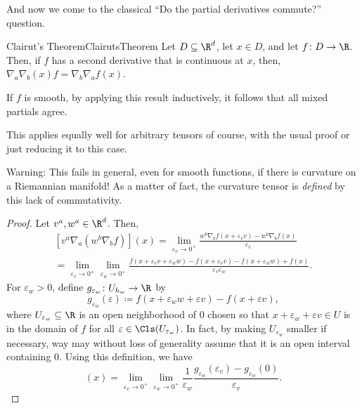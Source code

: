 And now we come to the classical ``Do the partial derivatives commute?'' question.
\begin{thm}{Clairut's Theorem}{ClairutsTheorem}
Let $D\subseteq \R ^d$, let $x\in D$, and let $f\colon D\rightarrow \R$.  Then, if $f$ has a second derivative that is continuous at $x$, then, $\nabla _a\nabla _b(x)f=\nabla _b\nabla _af(x)$.
\begin{rmk}
If $f$ is smooth, by applying this result inductively, it follows that all mixed partials agree.
\end{rmk}
\begin{rmk}
This applies equally well for arbitrary tensors of course, with the usual proof or just reducing it to this case.
\end{rmk}
\begin{wrn}
Warning:  This fails in general, even for smooth functions, if there is curvature on a Riemannian manifold!  As a matter of fact, the curvature tensor is \emph{defined} by this lack of commutativity.
\end{wrn}
\begin{proof}
Let $v^a,w^a\in \R ^d$.  Then,
{\small
\begin{equation}
\begin{multlined}
[v^a\nabla _a(w^b\nabla _bf)](x)=\lim _{\varepsilon _v\to 0^+}\frac{w^b\nabla _bf(x+\varepsilon _vv)-w^b\nabla _bf(x)}{\varepsilon _v} \\ =\lim _{\varepsilon _v\to 0^+}\lim _{\varepsilon _w\to 0^+}\frac{f(x+\varepsilon _vv+\varepsilon _ww)-f(x+\varepsilon _vv)-f(x+\varepsilon _ww)+f(x)}{\varepsilon _v\varepsilon _w}.
\end{multlined}
\end{equation}
}
For $\varepsilon _w>0$, define $g_{\varepsilon _w}\colon U_{h_w}\rightarrow \R$ by
\begin{equation}
g_{\varepsilon _w}(\varepsilon )\coloneqq f(x+\varepsilon _ww+\varepsilon v)-f(x+\varepsilon v),
\end{equation}
where $U_{\varepsilon _w}\subseteq \R $ is an open neighborhood of $0$ chosen so that $x+\varepsilon _w+\varepsilon v\in U$ is in the domain of $f$ for all $\varepsilon \in \Cls (U_{\varepsilon _w})$.  In fact, by making $U_{\varepsilon _w}$ smaller if necessary, way may without loss of generality assume that it is an open interval containing $0$.  Using this definition, we have
\begin{equation}
[v^a\nabla _a(w^b\nabla _bf)](x)=\lim _{\varepsilon _v\to 0^+}\lim _{\varepsilon _w\to 0^+}\frac{1}{\varepsilon _w}\frac{g_{\varepsilon _w}(\varepsilon _v)-g_{\varepsilon _w}(0)}{\varepsilon _v}.

\end{equation}
\end{proof}
\end{thm}
